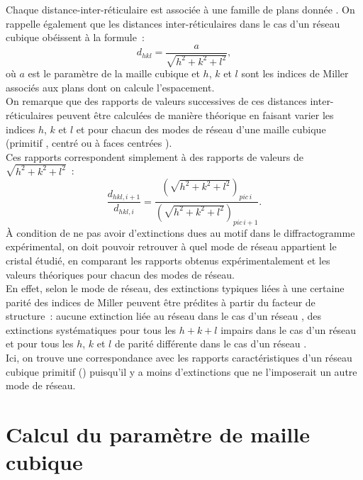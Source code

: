 Chaque distance-inter-réticulaire est associée à une famille de plans donnée .
On rappelle également que les distances inter-réticulaires dans le cas d'un réseau cubique obéissent à la formule~:
\begin{equation}
d_{hkl} = \frac{a}{\sqrt{h^2 + k^2 + l^2}},
\label{eq:dhklVsA}
\end{equation}
où \(a\) est le paramètre de la maille cubique et \(h\), \(k\) et \(l\) sont les indices de Miller associés aux plans dont on calcule l'espacement.\\
On remarque que des rapports de valeurs successives de ces distances inter-réticulaires peuvent être calculées de manière théorique en faisant varier les indices \(h\), \(k\) et \(l\) et pour chacun des modes de réseau d'une maille cubique (primitif , centré  ou à faces centrées ).\\
Ces rapports correspondent simplement à des rapports de valeurs de \(\sqrt{h^2 + k^2 + l^2}\)~:
\begin{equation}
\frac{d_{hkl,i+1}}{d_{hkl,i}} = \frac{\left(\sqrt{h^2 + k^2 + l^2}\right)_{pic\, i}}{\left(\sqrt{h^2 + k^2 + l^2}\right)_{pic\, i+1}}.
\end{equation}
À condition de ne pas avoir d'extinctions dues au motif dans le diffractogramme expérimental, on doit pouvoir retrouver à quel mode de réseau appartient le cristal étudié, en comparant les rapports obtenus expérimentalement et les valeurs théoriques pour chacun des modes de réseau.\\
En effet, selon le mode de réseau, des extinctions typiques liées à une certaine parité des indices de Miller peuvent être prédites à partir du facteur de structure~: aucune extinction liée au réseau dans le cas d'un réseau , des extinctions systématiques pour tous les \(h + k + l\) impairs dans le cas d'un réseau  et pour tous les \(h\), \(k\) et \(l\) de parité différente dans le cas d'un réseau .\\
Ici, on trouve une correspondance avec les rapports caractéristiques d'un réseau cubique primitif () puisqu'il y a moins d'extinctions que ne l'imposerait un autre mode de réseau.

\section{Calcul du paramètre de maille cubique}

